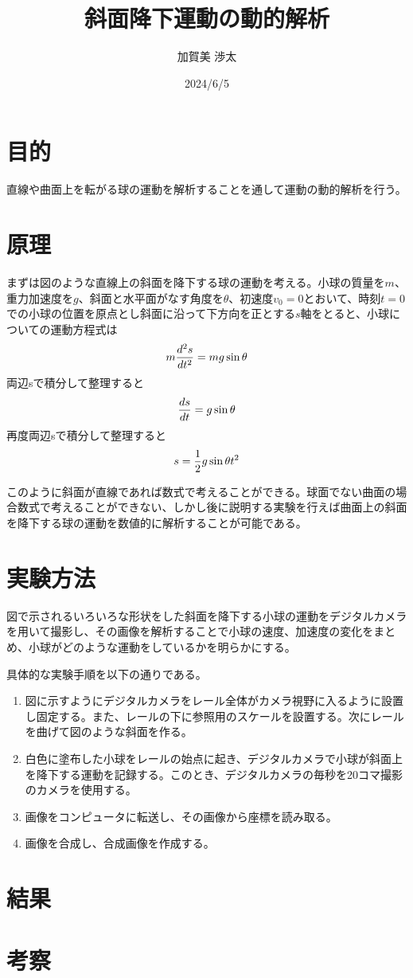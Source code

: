 \documentclass{jlreq}
\begin{document}
  \title{斜面降下運動の動的解析}
  \date{2024/6/5}
  \author{加賀美 渉太}
  \maketitle

  \section{目的}
  直線や曲面上を転がる球の運動を解析することを通して運動の動的解析を行う。
  
  \section{原理}
  まずは図のような直線上の斜面を降下する球の運動を考える。小球の質量を$m$、重力加速度を$g$、斜面と水平面がなす角度を$\theta$、初速度$v_0=0$とおいて、時刻$t=0$での小球の位置を原点とし斜面に沿って下方向を正とする$s$軸をとると、小球についての運動方程式は
  \[m\frac{d^2s}{dt^2}=mg\sin \theta \\\]
  両辺sで積分して整理すると
  \[\frac{ds}{dt}=g\sin \theta \\\]
  再度両辺sで積分して整理すると
  \[s=\frac{1}{2}g\sin \theta \\t^2\]

  このように斜面が直線であれば数式で考えることができる。球面でない曲面の場合数式で考えることができない、しかし後に説明する実験を行えば曲面上の斜面を降下する球の運動を数値的に解析することが可能である。
  \section{実験方法}
  図で示されるいろいろな形状をした斜面を降下する小球の運動をデジタルカメラを用いて撮影し、その画像を解析することで小球の速度、加速度の変化をまとめ、小球がどのような運動をしているかを明らかにする。

具体的な実験手順を以下の通りである。
  \begin{enumerate}
    \item 図に示すようにデジタルカメラをレール全体がカメラ視野に入るように設置し固定する。また、レールの下に参照用のスケールを設置する。次にレールを曲げて図のような斜面を作る。
    \item 白色に塗布した小球をレールの始点に起き、デジタルカメラで小球が斜面上を降下する運動を記録する。このとき、デジタルカメラの毎秒を20コマ撮影のカメラを使用する。
    \item 画像をコンピュータに転送し、その画像から座標を読み取る。
    \item 画像を合成し、合成画像を作成する。
  \end{enumerate}
  \section{結果}
  
  \section{考察}
  
\end{document}
